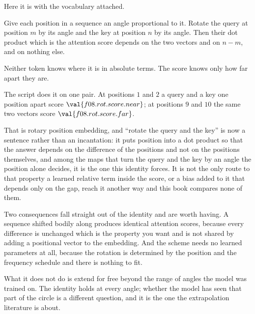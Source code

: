 \begin{fr}
Here it is with the vocabulary attached.

Give each position in a sequence an angle proportional to it. Rotate the query
at position $m$ by its angle and the key at position $n$ by its angle. Then
their dot product \dash{} which is the attention score \dash{} depends on the
two vectors and on $n - m$, and on nothing else.

Neither token knows where it is in absolute terms. The score knows only how far
apart they are.

The script does it on one pair. At positions $1$ and $2$ a query and a key
one position apart score $\val{f08.rot.score.near}$; at positions $9$ and
$10$ the same two vectors score $\val{f08.rot.score.far}$.

\begin{aibox}
That is rotary position embedding, and \enquote{rotate the query and the key}
is now a sentence rather than an incantation: it puts position into a dot
product so that the answer depends on the difference of the positions and not
on the positions themselves, and among the maps that turn the query and the
key by an angle the position alone decides, it is the one this identity
forces. It is not the only route to that property \dash{} a learned relative
term inside the score, or a bias added to it that depends only on the gap,
reach it another way \dash{} and this book compares none of them.

Two consequences fall straight out of the identity and are worth having. A
sequence shifted bodily along produces identical attention scores, because
every difference is unchanged \dash{} which is the property you want and is
not shared by adding a positional vector to the embedding. And the scheme
needs no learned parameters at all, because the rotation is determined by the
position and the frequency schedule and there is nothing to fit.

What it does not do is extend for free beyond the range of angles the model
was trained on. The identity holds at every angle; whether the model has seen
that part of the circle is a different question, and it is the one the
extrapolation literature is about.
\end{aibox}
\end{fr}


